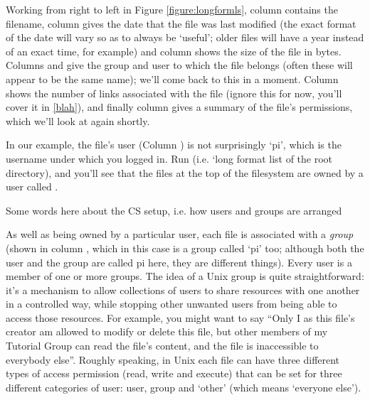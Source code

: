 Working from right to left in Figure \ref{figure:longformls}, column \protect{} contains the filename, column \protect{} gives the date that the file was last modified (the exact format of the date will vary so as to always be `useful'; older files will have a year instead of an exact time, for example) and column \protect{} shows the size of the file in bytes. Columns \protect{} and \protect{} give the group and user to which the file belongs (often these will appear to be the same name); we'll come back to this in a moment. Column \protect{} shows the number of links associated with the file (ignore this for now, you'll cover it in \ref{blah}), and finally column \protect{} gives a summary of the file's permissions, which we'll look at again shortly. 

In our example, the file's user (Column \protect{}) is not surprisingly `pi', which is the username under which you logged in. Run  (i.e. `long format list of the root directory), and you'll see that the files at the top of the filesystem are owned by a user called . 

\begin{note}
Some words here about the CS setup, i.e. how users and groups are arranged
\end{note}

As well as being owned by a particular user, each file is associated with a \textit{group} (shown in column \protect{}, which in this case is a group called `pi' too; although both the user and the group are called pi here, they are different things). Every user is a member of one or more groups. The idea of a Unix group is quite straightforward: it's a mechanism to allow collections of users to share resources with one another in a controlled way, while stopping other unwanted users from being able to access those resources. For example, you might want to say ``Only I as this file's creator am allowed to modify or delete this file, but other members of my Tutorial Group can read the file's content, and the file is inaccessible to everybody else''. Roughly speaking, in Unix each file can have three different types of access permission (read, write and execute) that can be set for three different categories of user: user, group and `other' (which means `everyone else').

